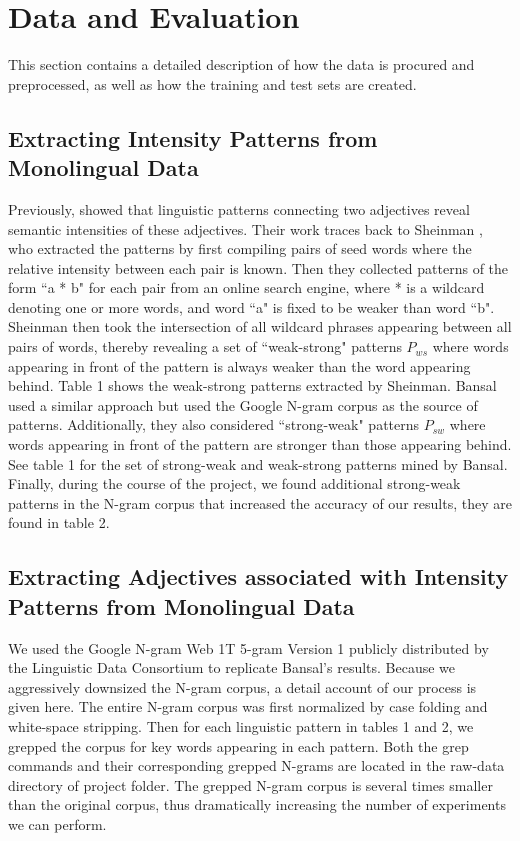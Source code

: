 \section{Data and Evaluation}

This section contains a detailed description of how the data is procured and preprocessed, as well as how the training and test sets are created. 

\subsection{Extracting Intensity Patterns from Monolingual Data}

Previously,  showed that linguistic patterns connecting two adjectives reveal semantic intensities of these adjectives. Their work traces back to Sheinman , who extracted the patterns by first compiling pairs of seed words where the relative intensity between each pair is known. Then they collected patterns of the form ``a * b" for each pair from an online search engine, where * is a wildcard denoting one or more words, and word ``a" is fixed to be weaker than word ``b". Sheinman then took the intersection of all wildcard phrases appearing between all pairs of words, thereby revealing a set of ``weak-strong" patterns $P_{ws}$ where words appearing in front of the pattern is always weaker than the word appearing behind. Table 1 shows the weak-strong patterns extracted by Sheinman. Bansal used a similar approach but used the Google N-gram corpus \cite{brants2006web} as the source of patterns. Additionally, they also considered ``strong-weak" patterns $P_{sw}$ where words appearing in front of the pattern are stronger than those appearing behind. See table 1 for the set of strong-weak and weak-strong patterns mined by Bansal. Finally, during the course of the project, we found additional strong-weak patterns in the N-gram corpus that increased the accuracy of our results, they are found in table 2.

\subsection{Extracting Adjectives associated with Intensity Patterns from Monolingual Data}

We used the Google N-gram Web 1T 5-gram Version 1 publicly distributed by the Linguistic Data Consortium to replicate Bansal's results. Because we aggressively downsized the N-gram corpus, a detail account of our process is given here. The entire N-gram corpus was first normalized by case folding and white-space stripping. Then for each linguistic pattern in tables 1 and 2, we grepped the corpus for key words appearing in each pattern. Both the grep commands and their corresponding grepped N-grams are located in the raw-data directory of project folder. The grepped N-gram corpus is several times smaller than the original corpus, thus dramatically increasing the number of experiments we can perform.

